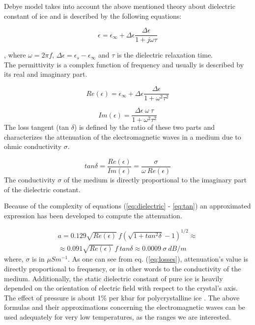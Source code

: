Debye model takes into account the above mentioned theory about dielectric constant of ice and is described by the following equations: 

\begin{equation}
    \epsilon=\epsilon_{\infty}+\Delta \epsilon \frac{\Delta \epsilon}{1+j \omega \tau}
    \label{eq:dielectric}
\end{equation}

, where $\omega = 2\pi f$, $\Delta \epsilon=\epsilon_{s} -\epsilon_{\infty}$ and $\tau$ is the dielectric relaxation time. \\
The permittivity is a complex function of frequency and usually is described by its real and imaginary part.

\begin{equation}
    Re (\epsilon)=\epsilon_{\infty}+\Delta \epsilon \frac{\Delta \epsilon}{1+ \omega^2 \tau^2}
\end{equation}

\begin{equation}
    Im (\epsilon)=\frac{\Delta \epsilon\ \omega\  \tau}{1+ \omega^2 \tau^2}
\end{equation}
The loss tangent (tan $\delta$) is defined by the ratio of these two parts and characterizes the attenuation of the electromagnetic waves in a medium due to ohmic conductivity $\sigma$. 

\begin{equation}
    tan \delta=\frac{Re(\epsilon)}{Im(\epsilon)}=\frac{\sigma}{\omega\ Re(\epsilon)}
    \label{eq:tan}
\end{equation}
The conductivity $\sigma$ of the medium is directly proportional to the imaginary part of the dielectric constant.

Because of the complexity of equations (\ref{eq:dielectric} - \ref{eq:tan}) an approximated expression has been developed to compute the attenuation.

\begin{multline}
    a=0.129 \sqrt{Re(\epsilon)}\ f (\sqrt{1+tan^2 \delta}-1)^{1/2} \approx \\
    \approx 0.091 \sqrt{Re(\epsilon)}\ f\ tan \delta \approx 0.0009\ \sigma\ dB/m
    \label{eq:losses}
\end{multline}
where, $\sigma$ is in $\mu S m^{-1}$. As one can see from eq. (\ref{eq:losses}), attenuation's value is directly proportional to frequency, or in other words to the conductivity of the medium. Additionally, the static dielectric constant of pure ice is heavily depended on the orientation of electric field with respect to the crystal's axis. The effect of pressure is about 1\% per kbar for polycrystalline ice \cite{Kofman_2010}. The above formulas and their approximations concerning the electromagnetic waves can be used adequately for very low temperatures, as the ranges we are interested.


